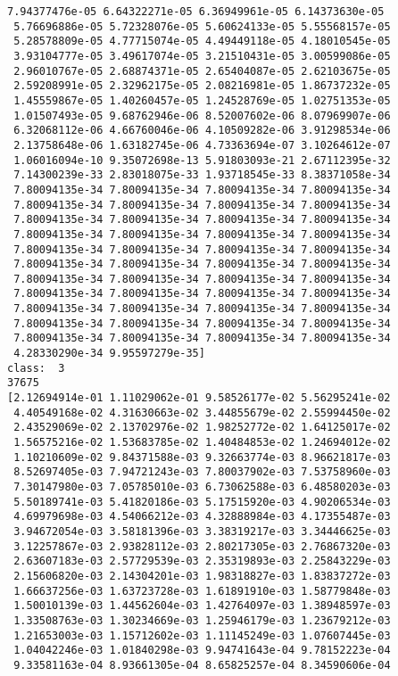 \documentclass[11pt]{article}
\begin{document}
\begin{Verbatim}[commandchars=\\\{\}]
 7.94377476e-05 6.64322271e-05 6.36949961e-05 6.14373630e-05
 5.76696886e-05 5.72328076e-05 5.60624133e-05 5.55568157e-05
 5.28578809e-05 4.77715074e-05 4.49449118e-05 4.18010545e-05
 3.93104777e-05 3.49617074e-05 3.21510431e-05 3.00599086e-05
 2.96010767e-05 2.68874371e-05 2.65404087e-05 2.62103675e-05
 2.59208991e-05 2.32962175e-05 2.08216981e-05 1.86737232e-05
 1.45559867e-05 1.40260457e-05 1.24528769e-05 1.02751353e-05
 1.01507493e-05 9.68762946e-06 8.52007602e-06 8.07969907e-06
 6.32068112e-06 4.66760046e-06 4.10509282e-06 3.91298534e-06
 2.13758648e-06 1.63182745e-06 4.73363694e-07 3.10264612e-07
 1.06016094e-10 9.35072698e-13 5.91803093e-21 2.67112395e-32
 7.14300239e-33 2.83018075e-33 1.93718545e-33 8.38371058e-34
 7.80094135e-34 7.80094135e-34 7.80094135e-34 7.80094135e-34
 7.80094135e-34 7.80094135e-34 7.80094135e-34 7.80094135e-34
 7.80094135e-34 7.80094135e-34 7.80094135e-34 7.80094135e-34
 7.80094135e-34 7.80094135e-34 7.80094135e-34 7.80094135e-34
 7.80094135e-34 7.80094135e-34 7.80094135e-34 7.80094135e-34
 7.80094135e-34 7.80094135e-34 7.80094135e-34 7.80094135e-34
 7.80094135e-34 7.80094135e-34 7.80094135e-34 7.80094135e-34
 7.80094135e-34 7.80094135e-34 7.80094135e-34 7.80094135e-34
 7.80094135e-34 7.80094135e-34 7.80094135e-34 7.80094135e-34
 7.80094135e-34 7.80094135e-34 7.80094135e-34 7.80094135e-34
 7.80094135e-34 7.80094135e-34 7.80094135e-34 7.80094135e-34
 4.28330290e-34 9.95597279e-35]
class:  3
37675
[2.12694914e-01 1.11029062e-01 9.58526177e-02 5.56295241e-02
 4.40549168e-02 4.31630663e-02 3.44855679e-02 2.55994450e-02
 2.43529069e-02 2.13702976e-02 1.98252772e-02 1.64125017e-02
 1.56575216e-02 1.53683785e-02 1.40484853e-02 1.24694012e-02
 1.10210609e-02 9.84371588e-03 9.32663774e-03 8.96621817e-03
 8.52697405e-03 7.94721243e-03 7.80037902e-03 7.53758960e-03
 7.30147980e-03 7.05785010e-03 6.73062588e-03 6.48580203e-03
 5.50189741e-03 5.41820186e-03 5.17515920e-03 4.90206534e-03
 4.69979698e-03 4.54066212e-03 4.32888984e-03 4.17355487e-03
 3.94672054e-03 3.58181396e-03 3.38319217e-03 3.34446625e-03
 3.12257867e-03 2.93828112e-03 2.80217305e-03 2.76867320e-03
 2.63607183e-03 2.57729539e-03 2.35319893e-03 2.25843229e-03
 2.15606820e-03 2.14304201e-03 1.98318827e-03 1.83837272e-03
 1.66637256e-03 1.63723728e-03 1.61891910e-03 1.58779848e-03
 1.50010139e-03 1.44562604e-03 1.42764097e-03 1.38948597e-03
 1.33508763e-03 1.30234669e-03 1.25946179e-03 1.23679212e-03
 1.21653003e-03 1.15712602e-03 1.11145249e-03 1.07607445e-03
 1.04042246e-03 1.01840298e-03 9.94741643e-04 9.78152223e-04
 9.33581163e-04 8.93661305e-04 8.65825257e-04 8.34590606e-04

\end{Verbatim}
\end{document}
